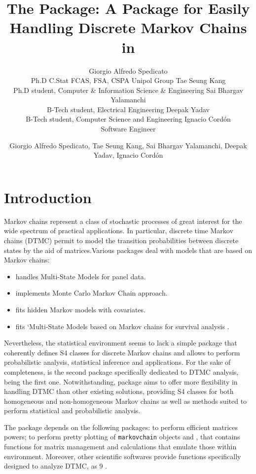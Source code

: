 \documentclass[
  nojss]{jss}
\author{
Giorgio Alfredo Spedicato\\Ph.D C.Stat FCAS, FSA, CSPA Unipol Group \And Tae Seung Kang\\Ph.D student, Computer \& Information Science \& Engineering \And Sai Bhargav Yalamanchi\\B-Tech student, Electrical Engineering \And Deepak Yadav\\B-Tech student, Computer Science and Engineering \And Ignacio Cordón\\Software Engineer
}
\title{The \pkg{markovchain} Package: A Package for Easily Handling Discrete Markov Chains in \proglang{R}}
\author{\small{Giorgio Alfredo Spedicato, Tae Seung Kang, Sai Bhargav Yalamanchi, Deepak Yadav, Ignacio Cordón}}
\providecommand{\tightlist}{%
  \setlength{\itemsep}{0pt}\setlength{\parskip}{0pt}}
\begin{document}
\hypertarget{introduction}{%
\section{Introduction}\label{introduction}}

Markov chains represent a class of stochastic processes of great interest for the wide spectrum of practical applications. In particular, discrete time Markov chains (DTMC) permit to model the transition probabilities between discrete states by the aid of matrices.Various  packages deal with models that are based on Markov chains:

\begin{itemize}
\tightlist
\item
   \citep{msmR} handles Multi-State Models for panel data.
\item
   \citep{mcmcR} implements Monte Carlo Markov Chain approach.
\item
   \citep{hmmR} fits hidden Markov models with covariates.
\item
   fits `Multi-State Models based on Markov chains for survival analysis \citep{mstateR}.
\end{itemize}

Nevertheless, the  statistical environment \citep{rSoftware} seems to lack a simple package that coherently defines S4 classes for discrete Markov chains and allows to perform probabilistic analysis, statistical inference and applications. For the sake of completeness,  is the second package specifically dedicated to DTMC analysis, being  \citep{DTMCPackR} the first one. Notwithstanding,  package \citep{pkg:markovchain} aims to offer more flexibility in handling DTMC than other existing solutions, providing S4 classes for both homogeneous and non-homogeneous Markov chains as well as methods suited to perform statistical and probabilistic analysis.

The  package depends on the following  packages:  \citep{expmR} to perform efficient matrices powers;  \citep{pkg:igraph} to perform pretty plotting of \texttt{markovchain} objects and  \citep{pkg:matlab}, that contains functions for matrix management and calculations that emulate those within  environment. Moreover, other scientific softwares provide functions specifically designed to analyze DTMC, as  9 \citep{mathematica9}.
\end{document}
